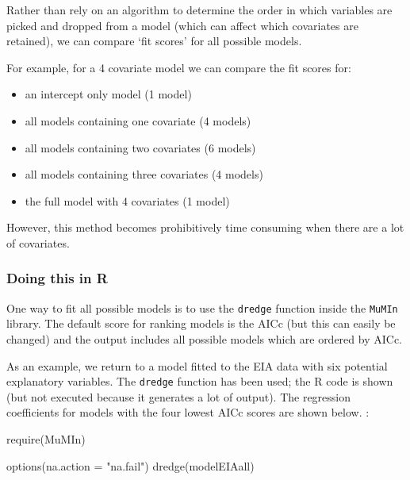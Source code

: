 \documentclass[
  oneside]{krantz}
\newenvironment{Shaded}{\begin{snugshade}}{\end{snugshade}}
\newcommand{\AttributeTok}[1]{\textcolor[rgb]{0.77,0.63,0.00}{#1}}
\newcommand{\FunctionTok}[1]{\textcolor[rgb]{0.00,0.00,0.00}{#1}}
\newcommand{\NormalTok}[1]{#1}
\newcommand{\StringTok}[1]{\textcolor[rgb]{0.31,0.60,0.02}{#1}}
\providecommand{\tightlist}{%
  \setlength{\itemsep}{0pt}\setlength{\parskip}{0pt}}
\begin{document}
Rather than rely on an algorithm to determine the order in which variables are picked and dropped from a model (which can affect which covariates are retained), we can compare `fit scores' for all possible models.

For example, for a 4 covariate model we can compare the fit scores for:

\begin{itemize}
\tightlist
\item
  an intercept only model (1 model)
\item
  all models containing one covariate (4 models)
\item
  all models containing two covariates (6 models)
\item
  all models containing three covariates (4 models)
\item
  the full model with 4 covariates (1 model)
\end{itemize}

However, this method becomes prohibitively time consuming when there are a lot of covariates.

\hypertarget{doing-this-in-r-26}{%
\subsubsection{Doing this in R}\label{doing-this-in-r-26}}

One way to fit all possible models is to use the \texttt{dredge} function inside the \texttt{MuMIn} library. The default score for ranking models is the AICc (but this can easily be changed) and the output includes all possible models which are ordered by AICc.

As an example, we return to a model fitted to the EIA data with six potential explanatory variables. The \texttt{dredge} function has been used; the R code is shown (but not executed because it generates a lot of output). The regression coefficients for models with the four lowest AICc scores are shown below. :

\begin{Shaded}
\begin{Highlighting}[]
\FunctionTok{require}\NormalTok{(MuMIn)}
\end{Highlighting}
\end{Shaded}

\begin{Shaded}
\begin{Highlighting}[]
\FunctionTok{options}\NormalTok{(}\AttributeTok{na.action =} \StringTok{"na.fail"}\NormalTok{)}
\FunctionTok{dredge}\NormalTok{(modelEIAall)}
\end{Highlighting}
\end{Shaded}
\end{document}
